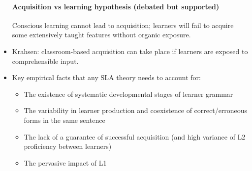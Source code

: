 \documentclass{article}
\begin{document}
\begin{itemize}
    \paragraph{Acquisition vs learning hypothesis (debated but supported)} Conscious learning cannot lead to acquisition; learners will fail to acquire some extensively taught features without organic exposure.
    \item Krahsen: classroom-based acquisition can take place if learners are exposed to comprehensible input.
    \item Key empirical facts that any SLA theory needs to account for:
    \begin{itemize}
        \item The existence of systematic developmental stages of learner grammar
        \item The variability in learner production and coexistence of correct/erroneous forms in the same sentence
        \item The lack of a guarantee of successful acquisition (and high variance of L2 proficiency between learners)
        \item The pervasive impact of L1
    \end{itemize}
\end{itemize}
\end{document}
